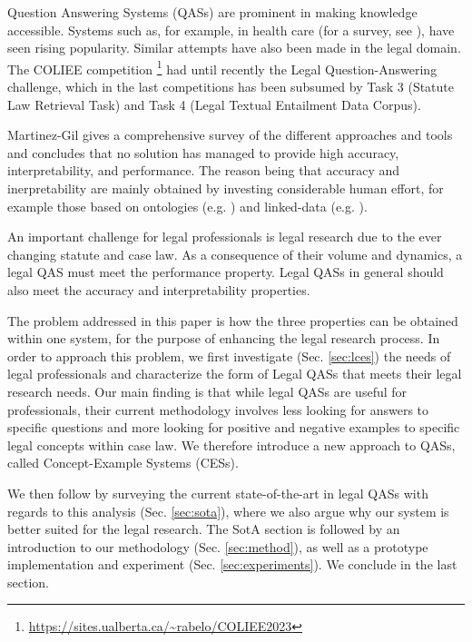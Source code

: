 Question Answering Systems (QASs) are prominent in making knowledge accessible. Systems such as, for example, in health care (for a survey, see \cite{budler2023review}), have seen rising popularity. Similar attempts have also been made in the legal domain. The COLIEE competition \footnote{\url{https://sites.ualberta.ca/~rabelo/COLIEE2023}} had until recently the Legal Question-Answering challenge, which in the last competitions has been subsumed by Task 3 (Statute Law Retrieval Task) and Task 4 (Legal Textual Entailment Data Corpus). 

Martinez-Gil \cite{martinez2023survey} gives a comprehensive survey of the different approaches and tools and concludes that no solution has managed to provide high accuracy, interpretability, and performance. The reason being that accuracy and inerpretability are mainly obtained by investing considerable human effort, for example those based on ontologies (e.g. \cite{fawei2018methodology}) and linked-data (e.g. \cite{filtz2021linked}).

An important challenge for legal professionals is legal research \cite{sanderson2021practical} due to the ever changing statute and case law. As a consequence of their volume and dynamics, a legal QAS must meet the performance property. Legal QASs in general should also meet the accuracy and interpretability properties. 

The problem addressed in this paper is how the three properties can be obtained within one system, for the purpose of enhancing the legal research process. In order to approach this problem, we first investigate (Sec. \ref{sec:lces}) the needs of legal professionals and characterize the form of Legal QASs that meets their legal research needs. Our main finding is that while legal QASs are useful for professionals, their current methodology involves less looking for answers to specific questions and more looking for positive and negative examples to specific legal concepts within case law. We therefore introduce a new approach to QASs, called Concept-Example Systems (CESs). 

We then follow by surveying the current state-of-the-art in legal QASs with regards to this analysis (Sec. \ref{sec:sota}), where we also argue why our system is better suited for the legal research. The SotA section is followed by an introduction to our methodology (Sec. \ref{sec:method}), as well as a prototype implementation and experiment (Sec. \ref{sec:experiments}). We conclude in the last section.